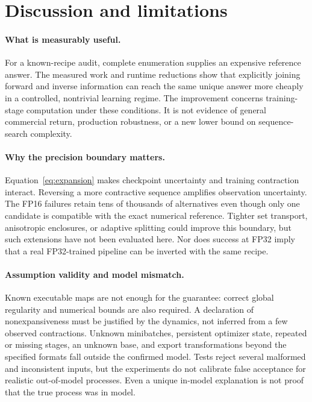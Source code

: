 \section{Discussion and limitations}
\paragraph{What is measurably useful.}
For a known-recipe audit, complete enumeration supplies an expensive reference answer. The measured work and runtime reductions show that explicitly joining forward and inverse information can reach the same unique answer more cheaply in a controlled, nontrivial learning regime. The improvement concerns training-stage computation under these conditions. It is not evidence of general commercial return, production robustness, or a new lower bound on sequence-search complexity.

\paragraph{Why the precision boundary matters.}
Equation~\eqref{eq:expansion} makes checkpoint uncertainty and training contraction interact. Reversing a more contractive sequence amplifies observation uncertainty. The FP16 failures retain tens of thousands of alternatives even though only one candidate is compatible with the exact numerical reference. Tighter set transport, anisotropic enclosures, or adaptive splitting could improve this boundary, but such extensions have not been evaluated here. Nor does success at FP32 imply that a real FP32-trained pipeline can be inverted with the same recipe.

\paragraph{Assumption validity and model mismatch.}
Known executable maps are not enough for the guarantee: correct global regularity and numerical bounds are also required. A declaration of nonexpansiveness must be justified by the dynamics, not inferred from a few observed contractions. Unknown minibatches, persistent optimizer state, repeated or missing stages, an unknown base, and export transformations beyond the specified formats fall outside the confirmed model. Tests reject several malformed and inconsistent inputs, but the experiments do not calibrate false acceptance for realistic out-of-model processes. Even a unique in-model explanation is not proof that the true process was in model.

